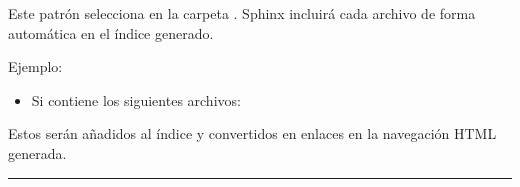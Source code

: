 \documentclass[a4paper,10pt,spanish]{sphinxmanual}
\begin{document}
\begin{itemize}
\begin{itemize}
\begin{itemize}
\begin{enumerate}
\begin{itemize}
\end{itemize}

\end{enumerate}

\begin{sphinxVerbatim}[commandchars=\\\{\}]
\end{sphinxVerbatim}

\sphinxAtStartPar
Este patrón selecciona  en la carpeta .
Sphinx incluirá cada archivo de forma automática en el índice generado.

\sphinxAtStartPar
Ejemplo:
\begin{itemize}
\item {} 
\sphinxAtStartPar
Si  contiene los siguientes archivos:

\end{itemize}

\begin{sphinxVerbatim}[commandchars=\\\{\}]
\end{sphinxVerbatim}

\sphinxAtStartPar
Estos serán añadidos al índice y convertidos en enlaces en la navegación HTML generada.

\end{itemize}

\end{itemize}

\end{itemize}


\bigskip\hrule\bigskip
\end{document}
